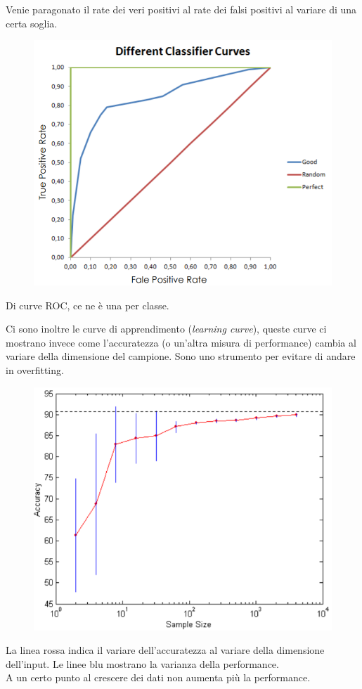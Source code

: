 Venie paragonato il rate dei veri positivi al rate dei falsi positivi al variare di una certa soglia.
\begin{figure}[H]
    \centering
    \includegraphics[scale=0.7]{imm/ROC_curve.png}
    \label{fig:roc_curve}
\end{figure}

Di curve ROC, ce ne è una per classe.

Ci sono inoltre le curve di apprendimento (\textit{learning curve}), queste curve ci mostrano invece come l’accuratezza (o un’altra misura di performance) cambia al variare della dimensione del campione. Sono uno strumento per evitare di andare in overfitting.\\

\begin{figure}[H]
    \centering
    \includegraphics[scale=0.7]{imm/learning_curve.png}
    \label{fig:learning_curve}
\end{figure}
La linea rossa indica il variare dell’accuratezza al variare della dimensione dell’input. Le linee blu mostrano la varianza della performance.\\
A un certo punto al crescere dei dati non aumenta più la performance. \\

